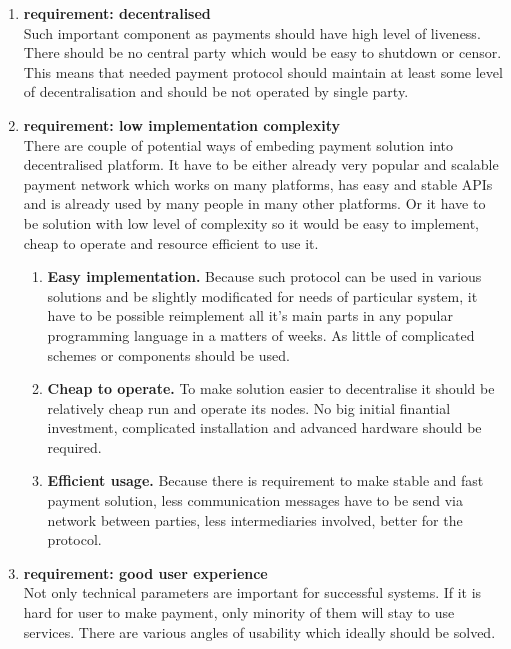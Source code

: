 \documentclass[a4paper,12pt]{article}
\begin{document}
\begin{enumerate}
    \item \textbf{requirement: decentralised}\\
    Such important component as payments should have high level of liveness. 
    There should be no central party which would be easy to shutdown or censor. 
    This means that needed payment protocol should maintain at least some level 
    of decentralisation and should be not operated by single party.

    \item \textbf{requirement: low implementation complexity}\\
    There are couple of potential ways of embeding payment solution into 
    decentralised platform. It have to be either already very popular and 
    scalable payment network which works on many platforms, has easy and stable
    APIs and is already used by many people in many other platforms. Or it have 
    to be solution with low level of complexity so it would be easy to implement, 
    cheap to operate and resource efficient to use it.

    \begin{enumerate}
        \item \textbf{Easy implementation.} Because such protocol can be used in 
        various solutions and be slightly modificated for needs of particular 
        system, it have to be possible reimplement all it's main parts in any 
        popular programming language in a matters of weeks. As little of 
        complicated schemes or components should be used.
        \item \textbf{Cheap to operate.} To make solution easier to decentralise 
        it should be relatively cheap run and operate its nodes. No big initial 
        finantial investment, complicated installation and advanced hardware 
        should be required.
        \item \textbf{Efficient usage.} Because there is requirement to make 
        stable and fast payment solution, less communication messages have to be
        send via network between parties, less intermediaries involved, better 
        for the protocol.
    \end{enumerate}

    \item \textbf{requirement: good user experience}\\
    Not only technical parameters are important for successful systems. If it 
    is hard for user to make payment, only minority of them will stay to use 
    services. There are various angles of usability which ideally should be 
    solved.


\end{enumerate}
\end{document}
